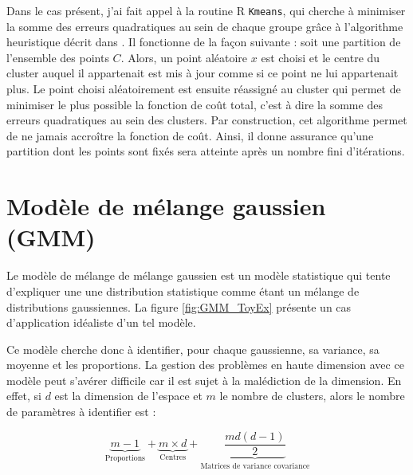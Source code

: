 \documentclass[12pt, french]{report}
\begin{document}
Dans le cas présent, j'ai fait appel à la routine R \texttt{Kmeans}, qui cherche à minimiser la somme des erreurs quadratiques au sein de chaque groupe grâce à l'algorithme heuristique décrit dans \cite{hartigan_algorithm_1979}. Il fonctionne de la façon suivante : soit une partition de l'ensemble des points $C$. Alors, un point aléatoire $x$ est choisi et le centre du cluster auquel il appartenait est mis à jour comme si ce point ne lui appartenait plus. Le point choisi aléatoirement est ensuite réassigné au cluster qui permet de minimiser le plus possible la fonction de coût total, c'est à dire la somme des erreurs quadratiques au sein des clusters. Par construction, cet algorithme permet de ne jamais accroître la fonction de coût. Ainsi, il donne assurance qu'une partition dont les points sont fixés sera atteinte après un nombre fini d'itérations.

\section{Modèle de mélange gaussien (GMM)}
\label{sec:Model_GMM}
Le modèle de mélange de mélange gaussien est un modèle statistique qui tente d'expliquer une une distribution statistique comme étant un mélange de distributions gaussiennes. La figure \ref{fig:GMM_ToyEx} présente un cas d'application idéaliste d'un tel modèle. 




Ce modèle cherche donc à identifier, pour chaque gaussienne, sa variance, sa moyenne et les proportions. La gestion des problèmes en haute dimension avec ce modèle peut s'avérer difficile car il est sujet à la malédiction de la dimension. En effet, si $d$ est la dimension de l'espace et $m$ le nombre de clusters, alors le nombre de paramètres à identifier est :

\begin{equation}
\underbrace{m-1}_\text{Proportions}  + \underbrace{m \times d}_\text{Centres}  +  \underbrace{\frac{md \left(d - 1\right)}{2}}_\text{Matrices de variance covariance}
\label{eq:Model_GMM_ParamNumber} 
\end{equation}
\end{document}
